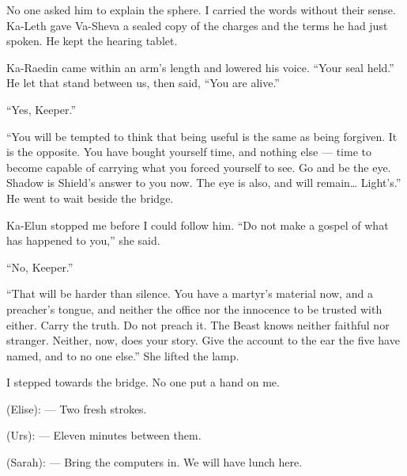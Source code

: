 No one asked him to explain the sphere. I carried the words without their sense. Ka-Leth gave Va-Sheva a sealed copy of the charges and the terms he had just spoken. He kept the hearing tablet.\par

\ornament

Ka-Raedin came within an arm's length and lowered his voice. ``Your seal held.'' He let that stand between us, then said, ``You are alive.''\par

``Yes, Keeper.''\par

``You will be tempted to think that being useful is the same as being forgiven. It is the opposite. You have bought yourself time, and nothing else --- time to become capable of carrying what you forced yourself to see. Go and be the eye. Shadow is Shield's answer to you now. The eye is also, and will remain\ldots{} Light's.'' He went to wait beside the bridge.\par

Ka-Elun stopped me before I could follow him. ``Do not make a gospel of what has happened to you,'' she said.\par

``No, Keeper.''\par

``That will be harder than silence. You have a martyr's material now, and a preacher's tongue, and neither the office nor the innocence to be trusted with either. Carry the truth. Do not preach it. The Beast knows neither faithful nor stranger. Neither, now, does your story. Give the account to the ear the five have named, and to no one else.'' She lifted the lamp.\par

I stepped towards the bridge. No one put a hand on me.\par

\begin{room}

(Elise): --- Two fresh strokes.

(Urs): --- Eleven minutes between them.

(Sarah): --- Bring the computers in. We will have lunch here.

\end{room}
